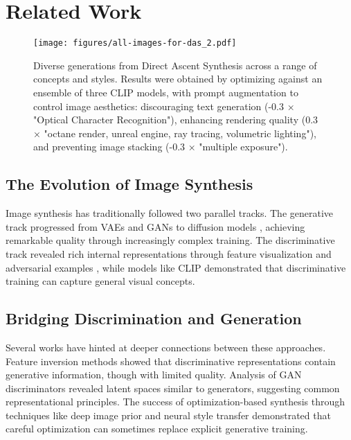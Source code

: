 \section{Related Work}
%
\begin{figure*}[t]
    \centering
    \texttt{[image: figures/all-images-for-das\_2.pdf]}
    \caption{Diverse generations from Direct Ascent Synthesis across a range of concepts and styles. Results were obtained by optimizing against an ensemble of three CLIP models, with prompt augmentation to control image aesthetics: discouraging text generation (-0.3 × "Optical Character Recognition"), enhancing rendering quality (0.3 × "octane render, unreal engine, ray tracing, volumetric lighting"), and preventing image stacking (-0.3 × "multiple exposure").}
    \label{fig:all-images}
\end{figure*}
%
\subsection{The Evolution of Image Synthesis}
Image synthesis has traditionally followed two parallel tracks. The generative track progressed from VAEs \cite{kingma2022autoencodingvariationalbayes} and GANs \cite{goodfellow2014generativeadversarialnetworks} to diffusion models \cite{ho2020denoisingdiffusionprobabilisticmodels,rombach2022highresolutionimagesynthesislatent}, achieving remarkable quality through increasingly complex training. The discriminative track revealed rich internal representations through feature visualization \cite{yosinski2015understandingneuralnetworksdeep, nguyen2016synthesizingpreferredinputsneurons, olah2017feature} and adversarial examples \cite{goodfellow2015explainingharnessingadversarialexamples}, while models like CLIP \cite{radford2021learningtransferablevisualmodels} demonstrated that discriminative training can capture general visual concepts.

\subsection{Bridging Discrimination and Generation}
Several works have hinted at deeper connections between these approaches. Feature inversion methods \cite{mahendran2014understanding} showed that discriminative representations contain generative information, though with limited quality. Analysis of GAN discriminators \cite{bau2019seeinggangenerate} revealed latent spaces similar to generators, suggesting common representational principles. The success of optimization-based synthesis through techniques like deep image prior \cite{Ulyanov_2018_CVPR} and neural style transfer \cite{Gatys_2016_CVPR} demonstrated that careful optimization can sometimes replace explicit generative training.

